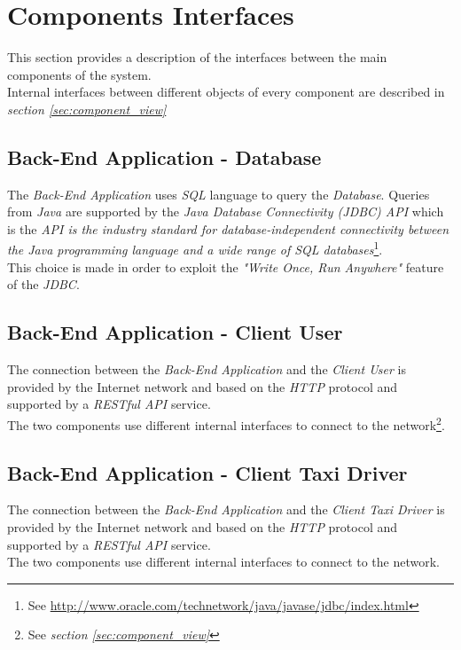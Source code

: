 \section{Components Interfaces} %
\label{sec:components_interfaces}
This section provides a description of the interfaces between the main components of the system.\\
Internal interfaces between different objects of every component are described in \emph{section \ref{sec:component_view}}
\subsection{Back-End Application - Database} %
\label{sub:back_end_application_database}
The \emph{Back-End Application} uses \emph{SQL} language to query the \emph{Database}. Queries from \emph{Java} are supported by the \emph{Java Database Connectivity (JDBC) API} which is the \emph{API is the industry standard for database-independent connectivity between the Java programming language and a wide range of SQL databases}\footnote{See \url{http://www.oracle.com/technetwork/java/javase/jdbc/index.html}}.\\
This choice is made in order to exploit the \emph{"Write Once, Run Anywhere"} feature of the \emph{JDBC}.
\subsection{Back-End Application - Client User} %
\label{sub:back_end_application_client_user}
The connection between the \emph{Back-End Application} and the \emph{Client User} is provided by the Internet network and based on the \emph{HTTP} protocol and supported by a \emph{RESTful API} service.\\
The two components use different internal interfaces to connect to the network\footnote{See \emph{section \ref{sec:component_view}}}.

\subsection{Back-End Application - Client Taxi Driver} %
\label{sub:back_end_application_client_taxi}
The connection between the \emph{Back-End Application} and the \emph{Client Taxi Driver} is provided by the Internet network and based on the \emph{HTTP} protocol and supported by a \emph{RESTful API} service.\\
The two components use different internal interfaces to connect to the network.

